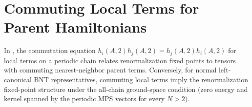 \section{Commuting Local Terms for Parent Hamiltonians}\label{sec:commuting_parent_ham}

In \cite[Definition~3.9 and Theorem~3.10]{Cirac2016MPDO_arXiv}, the commutation
equation $h_i(A,2)h_j(A,2)=h_j(A,2)h_i(A,2)$ for local terms on a periodic
chain relates renormalization fixed points to tensors with commuting
nearest-neighbor parent terms. Conversely, for normal left-canonical BNT
representatives, commuting local terms imply the renormalization fixed-point
structure under the all-chain ground-space condition (zero energy and kernel
spanned by the periodic MPS vectors for every $N>2$).







